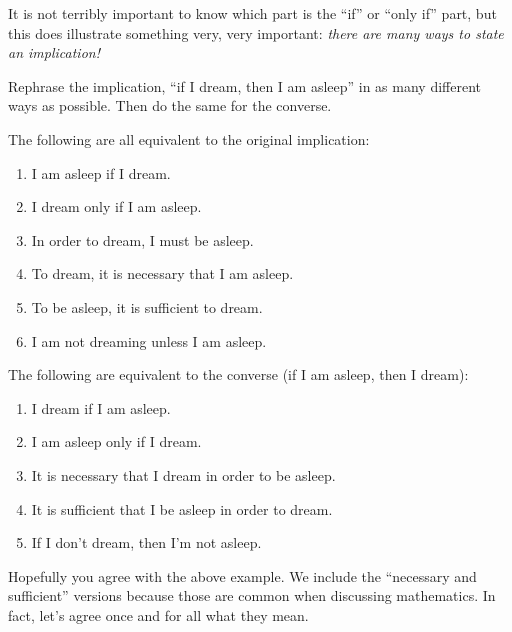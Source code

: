 \documentclass[11pt,]{book}
\theoremstyle{ptxplainnotitle}
\theoremstyle{ptxplaintitle}
\theoremstyle{ptxdefinitionnotitle}
\theoremstyle{ptxdefinitiontitle}
\theoremstyle{ptxdefinitionnotitle}
\theoremstyle{ptxdefinitiontitle}
\theoremstyle{ptxdefinitionnotitle}
\theoremstyle{ptxdefinitiontitle}
\theoremstyle{ptxdefinitiontitlenonumber}
\theoremstyle{ptxdefinitiontitlenonumber}
\numberwithin{equation}{chapter}
\begin{document}
\hypertarget{p-1798}{}%
It is not terribly important to know which part is the ``if'' or ``only if'' part, but this does illustrate something very, very important: \emph{there are many ways to state an implication!}%
\begin{example}\label{example-54}
\hypertarget{p-1799}{}%
Rephrase the implication, ``if I dream, then I am asleep'' in as many different ways as possible. Then do the same for the converse.%
\par\smallskip%
\noindent\textbf{}\hypertarget{solution-220}{}\hypertarget{p-1800}{}%
The following are all equivalent to the original implication: \leavevmode%
\begin{enumerate}
\item\hypertarget{li-763}{}\hypertarget{p-1801}{}%
I am asleep if I dream.%
\item\hypertarget{li-764}{}\hypertarget{p-1802}{}%
I dream only if I am asleep.%
\item\hypertarget{li-765}{}\hypertarget{p-1803}{}%
In order to dream, I must be asleep.%
\item\hypertarget{li-766}{}\hypertarget{p-1804}{}%
To dream, it is necessary that I am asleep.%
\item\hypertarget{li-767}{}\hypertarget{p-1805}{}%
To be asleep, it is sufficient to dream.%
\item\hypertarget{li-768}{}\hypertarget{p-1806}{}%
I am not dreaming unless I am asleep.%
\end{enumerate}
 The following are equivalent to the converse (if I am asleep, then I dream): \leavevmode%
\begin{enumerate}
\item\hypertarget{li-769}{}\hypertarget{p-1807}{}%
I dream if I am asleep.%
\item\hypertarget{li-770}{}\hypertarget{p-1808}{}%
I am asleep only if I dream.%
\item\hypertarget{li-771}{}\hypertarget{p-1809}{}%
It is necessary that I dream in order to be asleep.%
\item\hypertarget{li-772}{}\hypertarget{p-1810}{}%
It is sufficient that I be asleep in order to dream.%
\item\hypertarget{li-773}{}\hypertarget{p-1811}{}%
If I don't dream, then I'm not asleep.%
\end{enumerate}
%
\end{example}
\hypertarget{p-1812}{}%
Hopefully you agree with the above example. We include the ``necessary and sufficient'' versions because those are common when discussing mathematics. In fact, let's agree once and for all what they mean.%
\end{document}
